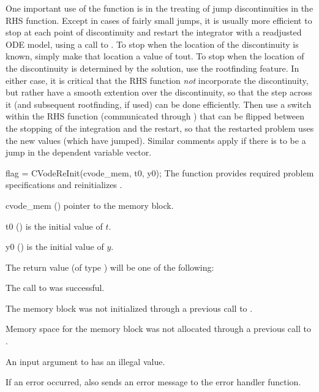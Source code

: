 One important use of the  function is in the treating
of jump discontinuities in the RHS function.  Except in cases of
fairly small jumps, it is usually more efficient to stop at each point
of discontinuity and restart the integrator with a readjusted ODE
model, using a call to .  To stop when the location of
the discontinuity is known, simply make that location a value of tout.
To stop when the location of the discontinuity is determined by the
solution, use the rootfinding feature.  In either case, it is critical
that the RHS function {\it not} incorporate the discontinuity, but
rather have a smooth extention over the discontinuity, so that the
step across it (and subsequent rootfinding, if used) can be done
efficiently.  Then use a switch within the RHS function (communicated
through ) that can be flipped between the stopping of
the integration and the restart, so that the restarted problem uses
the new values (which have jumped).  Similar comments apply if there
is to be a jump in the dependent variable vector.


{
  flag = CVodeReInit(cvode\_mem, t0, y0);
}
{
  The function  provides required problem specifications 
  and reinitializes {\cvode}.
}
{
  \begin{args}
  \item[cvode\_mem] ()
    pointer to the {\cvode} memory block.
  \item[t0] ()
    is the initial value of $t$.
  \item[y0] ()
    is the initial value of $y$. 
  \end{args}
}
{
  The return value  (of type ) will be one of the following:
  \begin{args}[CV\_NO\_MALLOC]
  \item[\Id{CV\_SUCCESS}]
    The call to  was successful.
  \item[\Id{CV\_MEM\_NULL}] 
    The {\cvode} memory block was not initialized through a 
    previous call to .
  \item[\Id{CV\_NO\_MALLOC}] 
    Memory space for the {\cvode} memory block was not allocated through a 
    previous call to .
  \item[\Id{CV\_ILL\_INPUT}] 
    An input argument to  has an illegal value.
  \end{args}
}
{
  If an error occurred,  also sends an error message to the
  error handler function.
}


